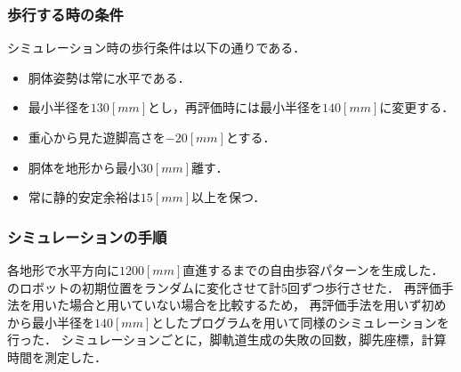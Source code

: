 \subsubsection{歩行する時の条件}
シミュレーション時の歩行条件は以下の通りである．
\begin{itemize}
  \item 胴体姿勢は常に水平である．
  \item 最小半径を$130 [mm]$とし，再評価時には最小半径を$140 [mm]$に変更する．
  \item 重心から見た遊脚高さを$-20 [mm]$とする．
  \item 胴体を地形から最小$30 [mm]$離す．
  \item 常に静的安定余裕は$15 [mm]$以上を保つ．
\end{itemize}

\subsubsection{シミュレーションの手順}
各地形で水平方向に$1200 [mm]$直進するまでの自由歩容パターンを生成した．
のロボットの初期位置をランダムに変化させて計5回ずつ歩行させた．
再評価手法を用いた場合と用いていない場合を比較するため，
再評価手法を用いず初めから最小半径を$140 [mm]$としたプログラムを用いて同様のシミュレーションを行った．
シミュレーションごとに，脚軌道生成の失敗の回数，脚先座標，計算時間を測定した．

